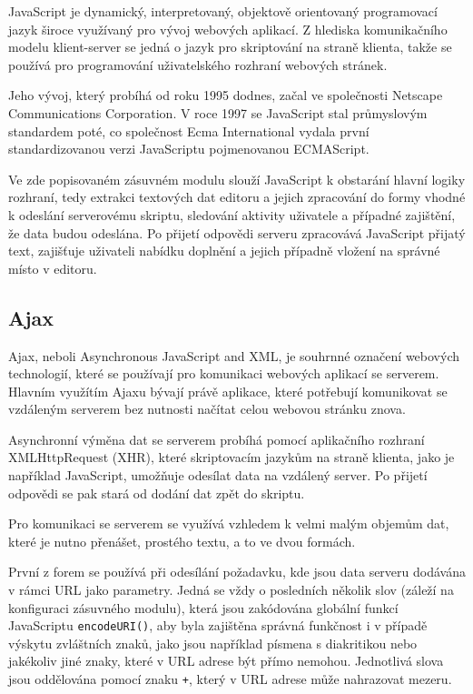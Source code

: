 \documentclass[a4paper,11pt]{article}
\begin{document}
JavaScript je dynamický, interpretovaný, objektově orientovaný programovací jazyk široce využívaný pro vývoj webových aplikací. Z hlediska komunikačního modelu klient-server se jedná o jazyk pro skriptování na straně klienta, takže se používá pro programování uživatelského rozhraní webových stránek. \parencite[2--4]{flanagan2006javascript} %


Jeho vývoj, který probíhá od roku 1995 dodnes, začal ve společnosti Netscape Communications Corporation. V roce 1997 se JavaScript stal průmyslovým standardem poté, co společnost Ecma International vydala první standardizovanou verzi JavaScriptu pojmenovanou ECMAScript. \parencite{brendaneich2011} %

Ve zde popisovaném zásuvném modulu slouží JavaScript k obstarání hlavní logiky rozhraní, tedy extrakci textových dat editoru a jejich zpracování do formy vhodné k odeslání serverovému skriptu, sledování aktivity uživatele a případné zajištění, že data budou odeslána. Po přijetí odpovědi serveru zpracovává JavaScript přijatý text, zajišťuje uživateli nabídku doplnění a jejich případně vložení na správné místo v editoru. 

\subsection{Ajax}

Ajax, neboli Asynchronous JavaScript and XML, je souhrnné označení webových technologií, které se používají pro komunikaci webových aplikací se serverem. Hlavním využítím Ajaxu bývají právě aplikace, které potřebují komunikovat se vzdáleným serverem bez nutnosti načítat celou webovou stránku znova. \parencite{garrett2005ajax}

Asynchronní výměna dat se serverem probíhá pomocí aplikačního rozhraní XMLHttpRequest (XHR), které skriptovacím jazykům na straně klienta, jako je například JavaScript, umožňuje odesílat data na vzdálený server. Po přijetí odpovědi se pak stará od dodání dat zpět do skriptu.

Pro komunikaci se serverem se využívá vzhledem k velmi malým objemům dat, které je nutno přenášet, prostého textu, a to ve dvou formách. 

První z forem se používá při odesílání požadavku, kde jsou data serveru dodávána v rámci URL jako parametry. Jedná se vždy o posledních několik slov (záleží na konfiguraci zásuvného modulu), která jsou zakódována globální funkcí JavaScriptu {\tt encodeURI()}, aby byla zajištěna správná funkčnost i v případě výskytu zvláštních znaků, jako jsou například písmena s diakritikou nebo jakékoliv jiné znaky, které v URL adrese být přímo nemohou. Jednotlivá slova jsou oddělována pomocí znaku {\tt +}, který v URL adrese může nahrazovat mezeru.
\end{document}
